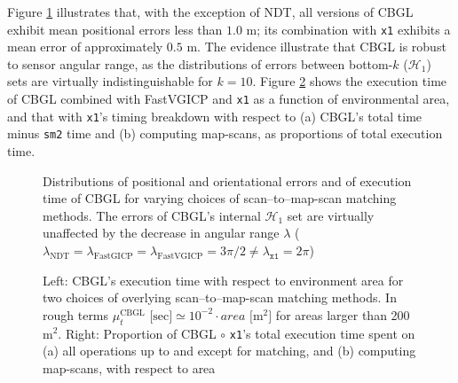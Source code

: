 Figure \ref{fig:c:errors_and_time} illustrates that, with the exception of NDT,
all versions of CBGL exhibit mean positional errors less than $1.0$ m; its
combination with \texttt{x1} exhibits a mean error of approximately $0.5$ m.
The evidence illustrate that CBGL is robust to sensor angular range, as the
distributions of errors between bottom-$k$ ($\mathcal{H}_1$) sets are
virtually indistinguishable for $k=10$. Figure \ref{fig:c:time_analysis} shows
the execution time of CBGL combined with FastVGICP and \texttt{x1} as a
function of environmental area, and that with \texttt{x1}'s timing breakdown
with respect to (a) CBGL's total time minus \texttt{sm2} time and (b) computing
map-scans, as proportions of total execution time.

\begin{figure}
  
  \vspace{0.1cm}
  \caption{\small Distributions of positional and orientational errors and of
           execution time of CBGL for varying choices of scan--to--map-scan
           matching methods. The errors of CBGL's internal $\mathcal{H}_1$ set
           are virtually unaffected by the decrease in angular range $\lambda$
           ($\lambda_{\text{NDT}} = \lambda_{\text{FastGICP}} =
           \lambda_{\text{FastVGICP}} = 3\pi/2 \neq \lambda_{\texttt{x1}} = 2\pi$)
           }
  \label{fig:c:errors_and_time}
\end{figure}

\begin{figure}
  \vspace{0.5cm}
  
  \vspace{0.6cm}
  \caption{\small Left: CBGL's execution time with respect to environment area
           for two choices of overlying scan--to--map-scan matching methods. In
           rough terms $\mu_t^{\text{CBGL}} \text{ [sec]} \simeq 10^{-2}\cdot area
           \text{ [} \text{m}^2 \text{]}$ for areas larger than 200 m$^2$.
           Right: Proportion of CBGL $\circ$ \texttt{x1}'s total execution time
           spent on (a) all operations up to and except for matching, and (b)
           computing map-scans, with respect to area}
  \vspace{-0.5cm}
  \label{fig:c:time_analysis}
\end{figure}
